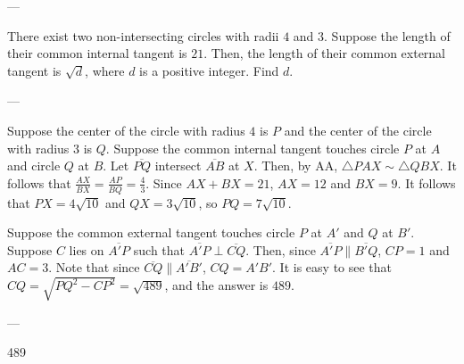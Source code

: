 
---

There exist two non-intersecting circles with radii $4$ and $3$. Suppose the length of their common internal tangent is $21$. Then, the length of their common external tangent is $\sqrt{d}$, where $d$ is a positive integer. Find $d$. 

---

Suppose the center of the circle with radius $4$ is $P$ and the center of the circle with radius $3$ is $Q$. Suppose the common internal tangent touches circle $P$ at $A$ and circle $Q$ at $B$. Let $\overline{PQ}$ intersect $\overline{AB}$ at $X$. Then, by AA, $\triangle PAX\sim\triangle QBX$. It follows that $\frac{AX}{BX}=\frac{AP}{BQ}=\frac{4}{3}$. Since $AX+BX=21$, $AX=12$ and $BX=9$. It follows that $PX=4\sqrt{10}$ and $QX=3\sqrt{10}$, so $PQ=7\sqrt{10}$. 

Suppose the common external tangent touches circle $P$ at $A'$ and $Q$ at $B'$. Suppose $C$ lies on $\overline{A'P}$ such that $\overline{A'P}\perp\overline{CQ}$. Then, since $\overline{A'P}\parallel\overline{B'Q}$, $CP=1$ and $AC=3$. Note that since $\overline{CQ}\parallel\overline{A'B'}$, $CQ=A'B'$. It is easy to see that $CQ=\sqrt{PQ^2-CP^2}=\sqrt{489}$, and the answer is $489$.

---

489
